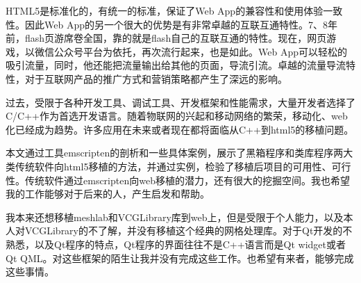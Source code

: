 HTML5是标准化的，有统一的标准，保证了Web App的兼容性和使用体验一致性。因此Web App的另一个很大的优势是有非常卓越的互联互通特性。7、8年前，flash页游席卷全国，靠的就是flash自己的互联互通的特性。现在，网页游戏，以微信公众号平台为依托，再次流行起来，也是如此。Web App可以轻松的吸引流量，同时，他还能把流量输出给其他的页面，导流引流。卓越的流量导流特性，对于互联网产品的推广方式和营销策略都产生了深远的影响。

过去，受限于各种开发工具、调试工具、开发框架和性能需求，大量开发者选择了C/C++作为首选开发语言。随着物联网的兴起和移动网络的繁荣，移动化、web化已经成为趋势。许多应用在未来或者现在都将面临从C++到html5的移植问题。

本文通过工具emscripten的剖析和一些具体案例，展示了黑箱程序和类库程序两大类传统软件向html5移植的方法，并通过实例，检验了移植后项目的可用性、可行性。传统软件通过emscripten向web移植的潜力，还有很大的挖掘空间。我也希望我的工作能够对于后来的人，产生启发和帮助。

我本来还想移植meshlab和VCGLibrary库到web上，但是受限于个人能力，以及本人对VCGLibrary的不了解，并没有移植这个经典的网格处理库。对于Qt开发的不熟悉，以及Qt程序的特点，Qt程序的界面往往不是C++语言而是Qt widget或者Qt QML。对这些框架的陌生让我并没有完成这些工作。也希望有来者，能够完成这些事情。